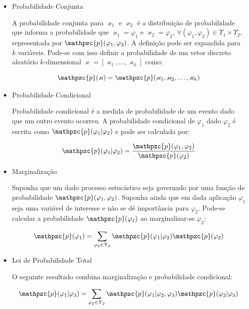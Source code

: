 {\begin{itemize}
\item Probabilidade Conjunta

A probabilidade conjunta para $\varkappa_1$ e $\varkappa_2$ é a distribuição de
probabilidade que informa a probabilidade que $\varkappa_1 = \varphi_1$ e
$\varkappa_2 = \varphi_2$, $\forall (\varphi_1, \varphi_2) \in \Upsilon_1 \times
\Upsilon_2$, representada por $\mathpzc{p}(\varphi_1, \varphi_2)$. A definição
pode ser expandida para $k$ variáveis. Pode-se com isso definir a probabilidade
de um vetor discreto aleatório $k$-dimensional $\mathbf{\varkappa} =
[\varkappa_1, \ldots, \varkappa_k]$ como:

\begin{equation}
\mathpzc{p}(\mathbf{\varkappa}) = \mathpzc{p}(\varkappa_1, \varkappa_2, \ldots, \varkappa_k) 
\end{equation}

\item Probabilidade Condicional

Probabilidade condicional é a medida de probabilidade de um evento dado que um
outro evento ocorreu. A probabilidade condicional de $\varphi_1$ dado
$\varphi_2$ é escrita como $\mathpzc{p}(\varphi_1 | \varphi_2)$ e pode ser
calculada por:

\begin{equation}
\mathpzc{p}(\varphi_1 | \varphi_2) = \frac{\mathpzc{p}(\varphi_1, \varphi_2)}{\mathpzc{p}(\varphi_2)}
\end{equation}


\item Marginalização

Suponha que um dado processo estocástico seja governado por uma função de
probabilidade $\mathpzc{p}(\varphi_1,\varphi_2)$.  Suponha ainda que em dada
aplicação $\varphi_1$ seja uma variável de interesse e não se dê importância
para $\varphi_2$. Pode-se calcular a probabilidade $\mathpzc{p}(\varphi_1)$ ao
marginalizar-se $\varphi_2$:

\begin{equation}
\mathpzc{p}(\varphi_1) = \sum_{\varphi_2 \in \Upsilon_2} \mathpzc{p}(\varphi_1|\varphi_2)\mathpzc{p}(\varphi_2)
\end{equation}

\item Lei de Probabilidade Total

O seguinte resultado combina marginalização e probabilidade condicional:

\begin{equation}
\mathpzc{p}(\varphi_1|\varphi_3) = \sum_{\varphi_2 \in \Upsilon_2} \mathpzc{p}(\varphi_1|\varphi_2, \varphi_3)\mathpzc{p}(\varphi_2|\varphi_3)
\end{equation}


\end{itemize}}
